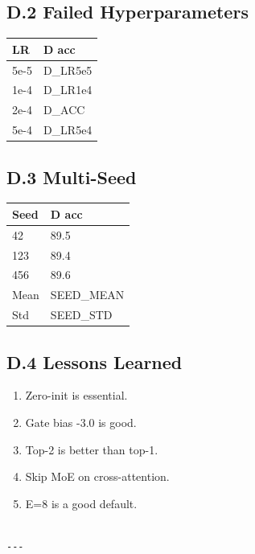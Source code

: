 \subsection{D.2 Failed Hyperparameters}

\begin{table}[H]
\centering
\small
\begin{tabular}{ll}
\toprule
\textbf{LR} & \textbf{D acc} \\
\midrule
5e-5 & {{D\_LR5e5}} \\
1e-4 & {{D\_LR1e4}} \\
2e-4 & {{D\_ACC}} \\
5e-4 & {{D\_LR5e4}} \\
\bottomrule
\end{tabular}
\end{table}

\subsection{D.3 Multi-Seed}

\begin{table}[H]
\centering
\small
\begin{tabular}{ll}
\toprule
\textbf{Seed} & \textbf{D acc} \\
\midrule
42 & 89.5 \\
123 & 89.4 \\
456 & 89.6 \\
Mean & {{SEED\_MEAN}} \\
Std & {{SEED\_STD}} \\
\bottomrule
\end{tabular}
\end{table}

\subsection{D.4 Lessons Learned}

\begin{enumerate}
\item Zero-init is essential.
\item Gate bias -3.0 is good.
\item Top-2 is better than top-1.
\item Skip MoE on cross-attention.
\item E=8 is a good default.
\end{enumerate}
\begin{lstlisting}

---
\end{lstlisting}